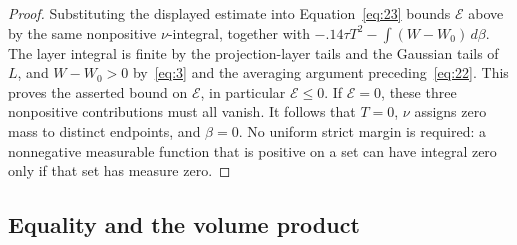 \begin{proof}
Substituting the displayed estimate into Equation~\eqref{eq:23} bounds \(\mathcal E\)
above by the same nonpositive
\(\nu\)-integral, together with
\(-.14\tau T^2-\int(W-W_0)\,d\beta\).
The layer integral is finite by the projection-layer tails and the Gaussian
tails of \(L\), and \(W-W_0>0\) by~\eqref{eq:3} and the averaging
argument preceding~\eqref{eq:22}.  This proves the asserted bound on
\(\mathcal E\), in particular \(\mathcal E\le0\).
If \(\mathcal E=0\), these three nonpositive contributions must all vanish.
It follows that \(T=0\), \(\nu\) assigns zero mass to distinct endpoints,
and \(\beta=0\).  No uniform strict margin is required: a nonnegative
measurable function that is positive on a set can have integral zero only
if that set has measure zero.
\end{proof}

\subsection{Equality and the volume product}

